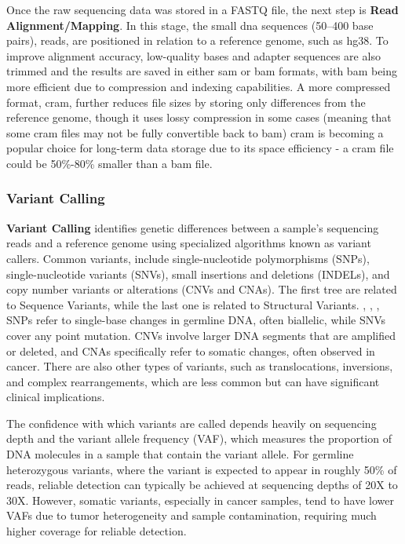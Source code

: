 Once the raw sequencing data was stored in a FASTQ file, the next step is \textbf{Read Alignment/Mapping}. \cite{Larson2023} In this stage, the small \ac{dna} sequences (50–400 base pairs), reads, are positioned in relation to a reference genome, such as \ac{hg38}.  \cite{Rehm2013} To improve alignment accuracy, low-quality bases and adapter sequences are also trimmed and the results are saved in either \ac{sam} or \ac{bam} formats, with \ac{bam} being more efficient due to compression and indexing capabilities. A more compressed format, \ac{cram}, further reduces file sizes by storing only differences from the reference genome, though it uses lossy compression in some cases (meaning that some \ac{cram} files may not be fully convertible back to \ac{bam}) \ac{cram} is becoming a popular choice for long-term data storage due to its space efficiency - a \ac{cram} file could be 50\%-80\% smaller than a \ac{bam} file. \cite{Larson2023}

\subsubsection{\textbf{Variant Calling}} \label{subsubsec:ngs_variantcalling}

\textbf{Variant Calling} identifies genetic differences between a sample's sequencing reads and a reference genome using specialized algorithms known as variant callers. Common variants, include single-nucleotide polymorphisms (SNPs), single-nucleotide variants (SNVs), small insertions and deletions (INDELs), and copy number variants or alterations (CNVs and CNAs). The first tree are related to Sequence Variants, while the last one is related to Structural Variants. \cite{Roy2018}, \cite{pipeline}, \cite{Roy2020}, \cite{Kanzi2020} SNPs refer to single-base changes in germline DNA, often biallelic, while SNVs cover any point mutation. CNVs involve larger DNA segments that are amplified or deleted, and CNAs specifically refer to somatic changes, often observed in cancer. \cite{Larson2023} There are also other types of variants, such as translocations, inversions, and complex rearrangements, which are less common but can have significant clinical implications. \cite{Roy2018}

The confidence with which variants are called depends heavily on sequencing depth and the variant allele frequency (VAF), which measures the proportion of DNA molecules in a sample that contain the variant allele. For germline heterozygous variants, where the variant is expected to appear in roughly 50\% of reads, reliable detection can typically be achieved at sequencing depths of 20X to 30X. However, somatic variants, especially in cancer samples, tend to have lower VAFs due to tumor heterogeneity and sample contamination, requiring much higher coverage for reliable detection. \cite{Larson2023}

